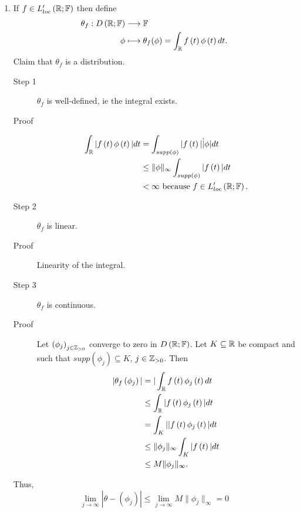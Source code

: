 \begin{example}
\begin{enumerate}
	\item If $f \in  L'_{loc}\left( \mathbb{R}; \mathbb{F} \right) $ then define 
		\begin{align*}
			\theta_{f}: D\left( \mathbb{R};\mathbb{F} \right)  &\longrightarrow \mathbb{F} \\
			\phi &\longmapsto \theta_{f}(\phi) = \int_{\mathbb{R}}^{ } f\left( t \right) \phi\left( t \right) dt 
		.\end{align*}
		Claim that $\theta_{f}$ is a distribution. 
		\begin{description}
			\item[Step 1] $\theta _{f}$ is well-defined, ie the integral exists. 
			\item[Proof] 
				\begin{align*}
					\int_{\mathbb{R}} |f\left( t \right) \phi\left( t \right) | dt &= \int_{supp\left( \phi \right) }^{ } |f\left( t \right) | \dot | \phi | dt  \\
												  &\le \|\phi\|_{\infty} \int_{supp\left( \phi \right) }^{ } |f\left( t \right) | dt \\
												  &< \infty\text{ because }f \in  L'_{loc} \left( \mathbb{R}; \mathbb{F} \right) 
				.\end{align*}
			\item[Step 2] $\theta _{f}$ is linear. 
			\item[Proof] Linearity of the integral. 
			\item[Step 3] $\theta _{f}$ is continuous. 
			\item[Proof] Let $\left( \phi_{j} \right) _{j \in  \mathbb{Z}_{>0}}$ converge to zero in $D\left( \mathbb{R}; \mathbb{F} \right) $. Let $K \subseteq \mathbb{R}$ be compact and such that $supp\left( \phi_{j} \right) \subseteq K$, $j \in  \mathbb{Z}_{>0}$. Then 
				\begin{align*}
					|\theta_{f}\left( \phi_{j} \right) | &=  |\int_{\mathbb{R}}^{ } f\left( t \right) \phi_{j}\left( t \right)  dt  \\
										&\le  \int_{\mathbb{R}}^{ } |f\left( t \right) \phi_{j} \left( t \right)  | dt \\
										&= \int_{K}^{ } |  |f\left( t \right) \phi_{j} \left( t \right)  | dt \\
										&\le \|\phi_{j}\|_{\infty} \int_{K}^{ } |f\left( t \right) | dt\\
										&\le M\|\phi_{j}\|_{\infty}
				.\end{align*}
		\end{description}
		Thus, 
		\[
			\lim_{j \to \infty} |\theta - \left( \phi_{j} \right) | \le  \lim_{j \to \infty} M \|\phi_{j}\|_{\infty} = 0
\]
\end{enumerate}
\end{example}
